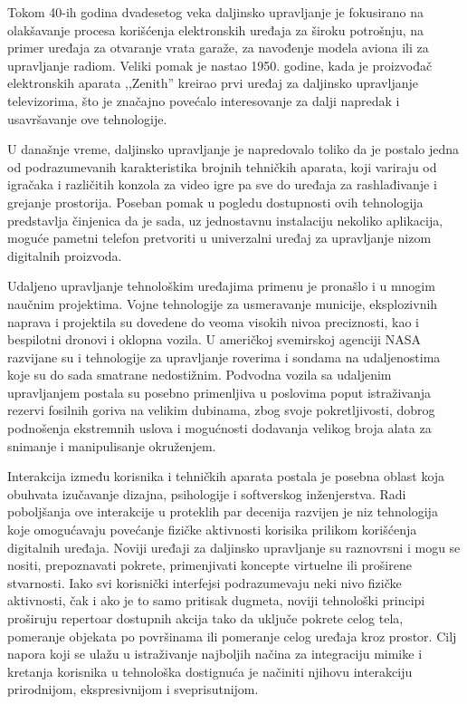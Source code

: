 \documentclass[12pt,a4paper]{report}
\begin{document}
Tokom 40-ih godina dvadesetog veka daljinsko upravljanje je fokusirano na olakšavanje procesa korišćenja elektronskih uređaja za široku potrošnju, na primer uređaja za otvaranje vrata garaže, za navođenje modela aviona ili za upravljanje radiom. Veliki pomak je nastao 1950. godine, kada je proizvođač elektronskih aparata ,,Zenith'' kreirao prvi uređaj za daljinsko upravljanje televizorima, što je značajno povećalo interesovanje za dalji napredak i usavršavanje ove tehnologije.

U današnje vreme, daljinsko upravljanje je napredovalo toliko da je postalo jedna od podrazumevanih karakteristika brojnih tehničkih aparata, koji variraju od igračaka i različitih konzola za video igre pa sve do uređaja za rashlađivanje i grejanje prostorija. Poseban pomak u pogledu dostupnosti ovih tehnologija predstavlja činjenica da je sada, uz jednostavnu instalaciju nekoliko aplikacija, moguće pametni telefon pretvoriti u univerzalni uređaj za upravljanje nizom digitalnih proizvoda.

Udaljeno upravljanje tehnološkim uređajima primenu je pronašlo i u mnogim naučnim projektima. Vojne tehnologije za usmeravanje municije, eksplozivnih naprava i projektila su dovedene do veoma visokih nivoa preciznosti, kao i bespilotni dronovi i oklopna vozila. U američkoj svemirskoj agenciji NASA razvijane su i tehnologije za upravljanje roverima i sondama na udaljenostima koje su do sada smatrane nedostižnim. Podvodna vozila sa udaljenim upravljanjem postala su posebno primenljiva u poslovima poput istraživanja rezervi fosilnih goriva na velikim dubinama, zbog svoje pokretljivosti, dobrog podnošenja ekstremnih uslova i mogućnosti dodavanja velikog broja alata za snimanje i manipulisanje okruženjem.

Interakcija između korisnika i tehničkih aparata postala je posebna oblast koja obuhvata izučavanje dizajna, psihologije i softverskog inženjerstva. Radi poboljšanja ove interakcije u proteklih par decenija razvijen je niz tehnologija koje omogućavaju povećanje fizičke aktivnosti korisika prilikom korišćenja digitalnih uređaja. Noviji uređaji za daljinsko upravljanje su raznovrsni i mogu se nositi, prepoznavati pokrete, primenjivati koncepte virtuelne ili proširene stvarnosti. Iako svi korisnički interfejsi podrazumevaju neki nivo fizičke aktivnosti, čak i ako je to samo pritisak dugmeta, noviji tehnološki principi proširuju repertoar dostupnih akcija tako da uključe pokrete celog tela, pomeranje objekata po površinama ili pomeranje celog uređaja kroz prostor. Cilj napora koji se ulažu u istraživanje najboljih načina za integraciju mimike i kretanja korisnika u tehnološka dostignuća je načiniti njihovu interakciju prirodnijom, ekspresivnijom i sveprisutnijom.
\end{document}

